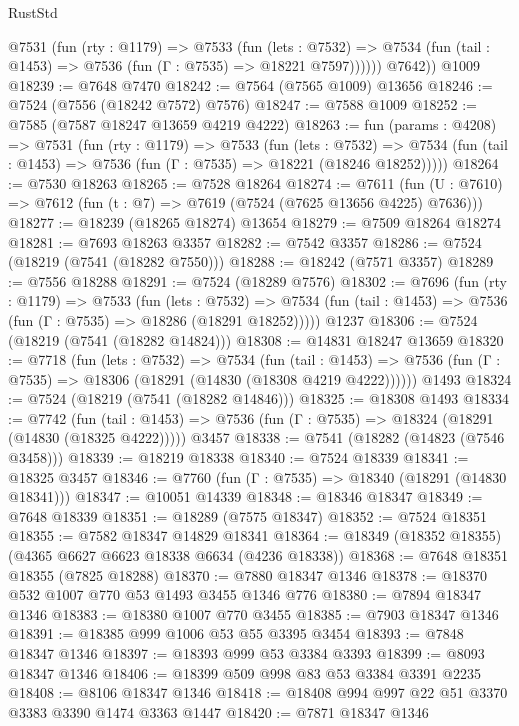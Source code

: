 \begin{lexlean}{RustStd}
\begin{coremodule}
          @7531
            (fun (rty : @1179) =>
            @7533
              (fun (lets : @7532) =>
              @7534 (fun (tail : @1453) => @7536 (fun (Γ : @7535) => @18221 @7597))))))
        @7642))
    @1009
@18239 := @7648 @7470
@18242 := @7564 (@7565 @1009) @13656
@18246 := @7524 (@7556 (@18242 @7572) @7576)
@18247 := @7588 @1009
@18252 := @7585 (@7587 @18247 @13659 @4219 @4222)
@18263 := fun (params : @4208) =>
  @7531
    (fun (rty : @1179) =>
    @7533
      (fun (lets : @7532) =>
      @7534 (fun (tail : @1453) => @7536 (fun (Γ : @7535) => @18221 (@18246 @18252)))))
@18264 := @7530 @18263
@18265 := @7528 @18264
@18274 := @7611
    (fun (U : @7610) => @7612 (fun (t : @7) => @7619 (@7524 (@7625 @13656 @4225) @7636)))
@18277 := @18239 (@18265 @18274) @13654
@18279 := @7509 @18264 @18274
@18281 := @7693 @18263 @3357
@18282 := @7542 @3357
@18286 := @7524 (@18219 (@7541 (@18282 @7550)))
@18288 := @18242 (@7571 @3357)
@18289 := @7556 @18288
@18291 := @7524 (@18289 @7576)
@18302 := @7696
    (fun (rty : @1179) =>
    @7533
      (fun (lets : @7532) =>
      @7534 (fun (tail : @1453) => @7536 (fun (Γ : @7535) => @18286 (@18291 @18252)))))
    @1237
@18306 := @7524 (@18219 (@7541 (@18282 @14824)))
@18308 := @14831 @18247 @13659
@18320 := @7718
    (fun (lets : @7532) =>
    @7534
      (fun (tail : @1453) =>
      @7536 (fun (Γ : @7535) => @18306 (@18291 (@14830 (@18308 @4219 @4222))))))
    @1493
@18324 := @7524 (@18219 (@7541 (@18282 @14846)))
@18325 := @18308 @1493
@18334 := @7742
    (fun (tail : @1453) => @7536 (fun (Γ : @7535) => @18324 (@18291 (@14830 (@18325 @4222)))))
    @3457
@18338 := @7541 (@18282 (@14823 (@7546 @3458)))
@18339 := @18219 @18338
@18340 := @7524 @18339
@18341 := @18325 @3457
@18346 := @7760 (fun (Γ : @7535) => @18340 (@18291 (@14830 @18341)))
@18347 := @10051 @14339
@18348 := @18346 @18347
@18349 := @7648 @18339
@18351 := @18289 (@7575 @18347)
@18352 := @7524 @18351
@18355 := @7582 @18347 @14829 @18341
@18364 := @18349 (@18352 @18355) (@4365 @6627 @6623 @18338 @6634 (@4236 @18338))
@18368 := @7648 @18351 @18355 (@7825 @18288)
@18370 := @7880 @18347 @1346
@18378 := @18370 @532 @1007 @770 @53 @1493 @3455 @1346 @776
@18380 := @7894 @18347 @1346
@18383 := @18380 @1007 @770 @3455
@18385 := @7903 @18347 @1346
@18391 := @18385 @999 @1006 @53 @55 @3395 @3454
@18393 := @7848 @18347 @1346
@18397 := @18393 @999 @53 @3384 @3393
@18399 := @8093 @18347 @1346
@18406 := @18399 @509 @998 @83 @53 @3384 @3391 @2235
@18408 := @8106 @18347 @1346
@18418 := @18408 @994 @997 @22 @51 @3370 @3383 @3390 @1474 @3363 @1447
@18420 := @7871 @18347 @1346

\end{coremodule}
\end{lexlean}
